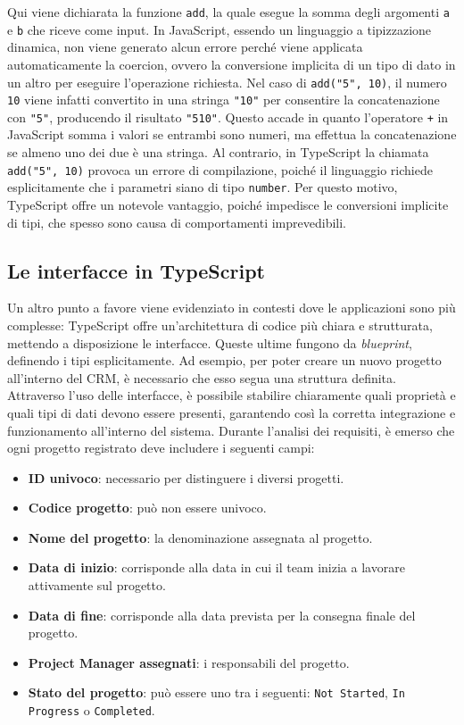 \documentclass[target=bach,aauheader=,style=]{thud}
\begin{document}
\noindent Qui viene dichiarata la funzione \texttt{add}, la quale esegue la somma degli argomenti \texttt{a} e \texttt{b} che riceve come input. In JavaScript, essendo un linguaggio a tipizzazione dinamica, non viene generato alcun errore perché viene applicata automaticamente la coercion, ovvero la conversione implicita di un tipo di dato in un altro per eseguire l'operazione richiesta. Nel caso di \texttt{add("5", 10)}, il numero \texttt{10} viene infatti convertito in una stringa \texttt{"10"} per consentire la concatenazione con \texttt{"5"}, producendo il risultato \texttt{"510"}. Questo accade in quanto l'operatore \texttt{+} in JavaScript somma i valori se entrambi sono numeri, ma effettua la concatenazione se almeno uno dei due è una stringa. Al contrario, in TypeScript la chiamata \texttt{add("5", 10)} provoca un errore di compilazione, poiché il linguaggio richiede esplicitamente che i parametri siano di tipo \texttt{number}. Per questo motivo, TypeScript offre un notevole vantaggio, poiché impedisce le conversioni implicite di tipi, che spesso sono causa di comportamenti imprevedibili.

\subsection{Le interfacce in TypeScript}
\noindent Un altro punto a favore viene evidenziato in contesti dove le applicazioni sono più complesse: TypeScript offre un'architettura di codice più chiara e strutturata, mettendo a disposizione le interfacce. Queste ultime fungono da \textit{blueprint}, definendo i tipi esplicitamente. Ad esempio, per poter creare un nuovo progetto all'interno del CRM, è necessario che esso segua una struttura definita. Attraverso l'uso delle interfacce, è possibile stabilire chiaramente quali proprietà e quali tipi di dati devono essere presenti, garantendo così la corretta integrazione e funzionamento all'interno del sistema. Durante l'analisi dei requisiti, è emerso che ogni progetto registrato deve includere i seguenti campi:

\begin{itemize}
    \item \textbf{ID univoco}: necessario per distinguere i diversi progetti.
    \item \textbf{Codice progetto}: può non essere univoco.
    \item \textbf{Nome del progetto}: la denominazione assegnata al progetto.
    \item \textbf{Data di inizio}: corrisponde alla data in cui il team inizia a lavorare attivamente sul progetto.
    \item \textbf{Data di fine}: corrisponde alla data prevista per la consegna finale del progetto.
    \item \textbf{Project Manager assegnati}: i responsabili del progetto.
    \item \textbf{Stato del progetto}: può essere uno tra i seguenti: \texttt{Not Started}, \texttt{In Progress} o \texttt{Completed}.
    
\end{itemize}
\end{document}
